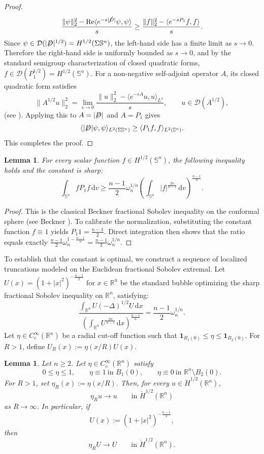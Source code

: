 \documentclass[a4paper, 12pt]{article}
\newtheorem{lemma}[theorem]{Lemma}
\def\slashiii#1{\setbox0=\hbox{$#1$}#1\hskip-\wd0\hbox to\wd0{\hss\sl/\/\hss}}
\begin{document}
\begin{proof}
\[	\frac{\|\psi\|_2^2-\operatorname{Re}\langle e^{-s|\slashiii{D}|}\psi,\psi\rangle}{s}
	\ge
	\frac{\|f\|_2^2-\langle e^{-sP_1}f,f\rangle}{s}.
	\]
	Since \(\psi\in\mathcal D(|\slashiii{D}|^{1/2})=H^{1/2}(\Sigma\mathbb S^n)\), the left-hand side has a finite limit as \(s\to0\). Therefore the right-hand side is uniformly bounded as \(s\to0\), and by the standard semigroup characterization of closed quadratic forms, \(f\in\mathcal D(P_1^{1/2})=H^{1/2}(\mathbb S^n)\). For a non-negative self-adjoint operator \(A\), its closed quadratic form satisfies
	\[
	\|A^{1/2}u\|_2^2
	=
	\lim_{s\to0}
	\frac{\|u\|_2^2-\langle e^{-sA}u,u\rangle_{L^2}}{s},
	\qquad u\in\mathcal D(A^{1/2}),
	\]
	(see \cite[Chapter VI]{MR203473}). Applying this to \(A=|\slashiii{D}|\) and \(A=P_1\) gives
	$$
	\langle |\slashiii{D}|\psi, \psi \rangle_{L^2(\Sigma \mathbb{S}^n)} \ge \langle P_1 f, f \rangle_{L^2(\mathbb{S}^n)}.
	$$
	This completes the proof.
\end{proof}
\begin{lemma}\label{Beckner Inequality}
	For every scalar function $f \in H^{1/2}(\mathbb{S}^n)$, the following inequality holds and the constant is sharp:
	$$\int_{\mathbb{S}^n} f P_1 f \, \text{d}v \ge \frac{n-1}{2} \omega_n^{1/n} \left( \int_{\mathbb{S}^n} |f|^{\frac{2n}{n-1}} \, \text{d}v \right)^{\frac{n-1}{n}}.$$
\end{lemma}
\begin{proof}
	This is the classical Beckner fractional Sobolev inequality on the conformal sphere (see Beckner \cite{MR1230930}). To calibrate the normalization, substituting the constant function $f \equiv 1$ yields $P_1 1 = \frac{n-1}{2}$. Direct integration then shows that the ratio equals exactly $\frac{n-1}{2} \omega_n^{1 - \frac{n-1}{n}} = \frac{n-1}{2} \omega_n^{1/n}$.
\end{proof}

To establish that the constant is optimal, we construct a sequence of localized truncations modeled on the Euclidean fractional Sobolev extremal. Let $U(x) = (1 + |x|^2)^{-\frac{n-1}{2}}$ for $x \in \mathbb{R}^n$ be the standard bubble optimizing the sharp fractional Sobolev inequality on $\mathbb{R}^n$, satisfying:
$$
\frac{\displaystyle \int_{\mathbb{R}^n} U (-\Delta)^{1/2} U \, \text{d}x}{\displaystyle \left( \int_{\mathbb{R}^n} U^{\frac{2n}{n-1}} \, \text{d}x \right)^{\frac{n-1}{n}}} = \frac{n-1}{2} \omega_n^{1/n}.
$$
Let $\eta \in C_c^\infty(\mathbb{R}^n)$ be a radial cut-off function such that $\mathbf{1}_{B_1(0)} \le \eta \le \mathbf{1}_{B_2(0)}$. For $R > 1$, define $U_R(x) := \eta(x/R) U(x)$. 
\begin{lemma}
	Let $n\ge 2$. Let $\eta\in C_c^\infty(\mathbb R^n)$ satisfy
	\[
	0\le \eta\le 1,\qquad
	\eta\equiv 1 \ \text{in } B_1(0),\qquad
	\eta\equiv 0 \ \text{in } \mathbb R^n\setminus B_2(0).
	\]
	For $R>1$, set $\eta_R(x):=\eta(x/R).$ Then, for every $u\in \dot H^{1/2}(\mathbb R^n)$,
	\[
	\eta_R u\to u
	\qquad\text{in } \dot H^{1/2}(\mathbb R^n)
	\]
	as $R\to\infty$. In particular, if
	\[
	U(x):=(1+|x|^2)^{-\frac{n-1}{2}},
	\]
	then
	\[
	\eta_R U\to U
	\qquad\text{in } \dot H^{1/2}(\mathbb R^n).
	\]
\end{lemma}
\end{document}
